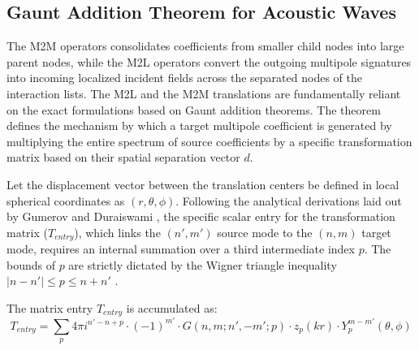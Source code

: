 \subsection{Gaunt Addition Theorem for Acoustic Waves} \label{subsec:gaunt-addition-theorem}
The \ac{M2M} operators consolidates coefficients from smaller child nodes into large parent nodes, while the \ac{M2L} operators convert the outgoing multipole signatures into incoming localized incident fields across the separated nodes of the interaction lists. 
The \ac{M2L} and the \ac{M2M} translations are fundamentally reliant on the exact formulations based on Gaunt addition theorems.
The theorem defines the mechanism by which a target multipole coefficient is generated by multiplying the entire spectrum of source coefficients by a specific transformation matrix based on their spatial separation vector $d$.

Let the displacement vector between the translation centers be defined in local spherical coordinates as $(r, \theta, \phi)$. Following the analytical derivations laid out by Gumerov and Duraiswami \cite{gumerovbroadbandfastmultipole2009}, the specific scalar entry for the transformation matrix ($T_{entry}$), which links the $(n', m')$ source mode to the $(n, m)$ target mode, requires an internal summation over a third intermediate index $p$. The bounds of $p$ are strictly dictated by the Wigner triangle inequality $|n-n'| \leq p \leq n+n'$ \cite{gumerovrecursionscomputationmultipole2004}.


The matrix entry $T_{entry}$ is accumulated as:
\begin{equation}
    T_{entry} = \sum_{p} 4\pi i^{n' - n + p} \cdot (-1)^{m'} \cdot G(n, m; n', -m'; p) \cdot z_p(kr) \cdot Y_p^{m-m'}(\theta, \phi)
\end{equation}

